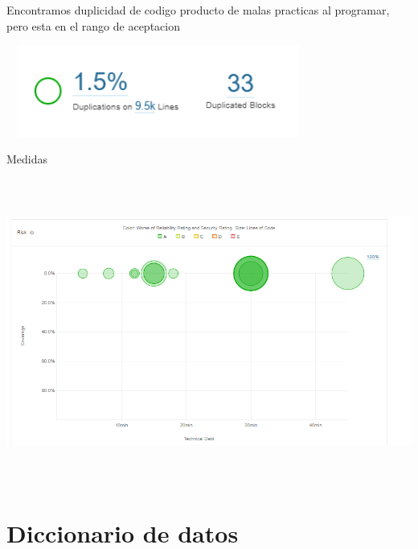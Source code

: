\documentclass[12pt,letterpaper]{article}
\begin{document}
Encontramos duplicidad de codigo producto de malas practicas al programar,
 pero esta en el rango de aceptacion
 \begin{center}
    \includegraphics[width=10cm, height=3cm]{img/2scan7.png}  
\end{center}
\newpage
Medidas
\begin{center}
    \includegraphics[width=18cm, height=10cm]{img/2scanF.png}  
\end{center}


\section{Diccionario de datos}
\end{document}
